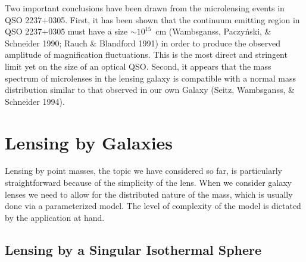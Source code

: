 \documentclass[a4paper,10pt]{article} %
\begin{document}
Two important conclusions have been drawn from the microlensing events
in QSO 2237$+$0305. First, it has been shown that the continuum
emitting region in QSO 2237$+$0305 must have a size $\sim10^{15}$~cm
(Wambsganss, Paczy\'nski, \& Schneider 1990; Rauch \& Blandford 1991)
in order to produce the observed amplitude of magnification
fluctuations. This is the most direct and stringent limit yet on the
size of an optical QSO. Second, it appears that the mass spectrum of
microlenses in the lensing galaxy is compatible with a normal mass
distribution similar to that observed in our own Galaxy (Seitz,
Wambsganss, \& Schneider 1994).

\section{Lensing by Galaxies}
\label{NB:sect3}

Lensing by point masses, the topic we have considered so far, is
particularly straightforward because of the simplicity of the lens.
When we consider galaxy lenses we need to allow for the distributed
nature of the mass, which is usually done via a parameterized model.
The level of complexity of the model is dictated by the application at
hand.

\subsection{Lensing by a Singular Isothermal Sphere}
\label{NB:subsect3.1}
\end{document}
